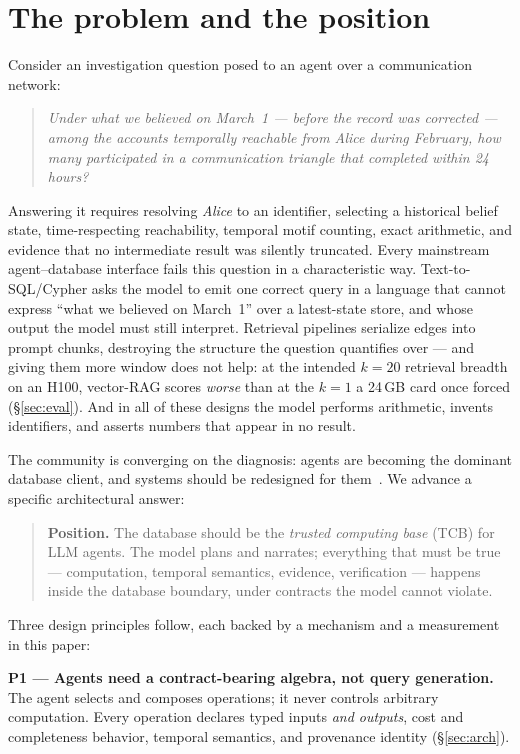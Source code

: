 \documentclass[sigconf]{acmart}
\begin{document}
\section{The problem and the position}
\label{sec:position}

Consider an investigation question posed to an agent over a
communication network:
\begin{quote}\itshape
Under what we believed on March~1 --- before the record was corrected
--- among the accounts temporally reachable from Alice during February,
how many participated in a communication triangle that completed within
24 hours?
\end{quote}
Answering it requires resolving \emph{Alice} to an identifier, selecting
a historical belief state, time-respecting reachability, temporal motif
counting, exact arithmetic, and evidence that no intermediate result was
silently truncated. Every mainstream agent--database interface fails
this question in a characteristic way. Text-to-SQL/Cypher asks the model
to emit one correct query in a language that cannot express ``what we
believed on March~1'' over a latest-state store, and whose output the
model must still interpret. Retrieval pipelines serialize edges into
prompt chunks, destroying the structure the question quantifies over ---
and giving them more window does not help: at the intended $k{=}20$
retrieval breadth on an H100, vector-RAG scores \emph{worse} than at
the $k{=}1$ a 24\,GB card once forced (\S\ref{sec:eval}). And in all of these designs the model performs
arithmetic, invents identifiers, and asserts numbers that appear in no
result.

The community is converging on the diagnosis: agents are becoming the
dominant database client, and systems should be redesigned for
them~\cite{liu2026agentfirst,urban2024caesura,wang2025aop}. We advance a
specific architectural answer:

\begin{quote}
\textbf{Position.} The database should be the \emph{trusted computing
base} (TCB) for LLM agents. The model plans and narrates; everything
that must be true --- computation, temporal semantics, evidence,
verification --- happens inside the database boundary, under contracts
the model cannot violate.
\end{quote}

Three design principles follow, each backed by a mechanism and a
measurement in this paper:

\textbf{P1 --- Agents need a contract-bearing algebra, not query
generation.} The agent selects and composes operations; it never
controls arbitrary computation. Every operation declares typed inputs
\emph{and outputs}, cost and completeness behavior, temporal semantics,
and provenance identity (\S\ref{sec:arch}).
\end{document}
